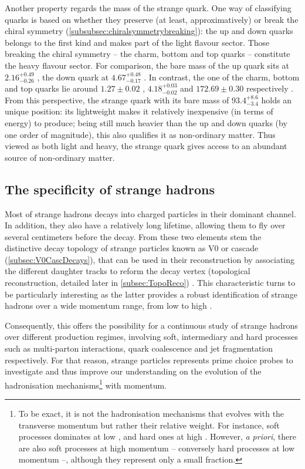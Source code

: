 Another property regards the mass of the strange quark. One way of classifying quarks is based on whether they preserve (at least, approximatively) or break the chiral symmetry (\Sec\ref{subsubsec:chiralsymmetrybreaking}): the up and down quarks belongs to the first kind and makes part of the light flavour sector. Those breaking the chiral symmetry -- the charm, bottom and top quarks -- constitute the heavy flavour sector. For comparison, the bare mass of the up quark sits at $2.16_{-0.26}^{+0.49}$ \mmass, the down quark at $4.67_{-0.17}^{+0.48}$ \mmass. In contrast, the one of the charm, bottom and top quarks lie around $1.27 \pm 0.02$ \gmass, $4.18_{-0.02}^{+0.03}$ \gmass and $172.69 \pm 0.30$ \gmass respectively \cite{particledatagroupReviewParticlePhysics2022}. From this perspective, the strange quark with its bare mass of $93.4_{-3.4}^{+8.6}$ \mev holds an unique position: its lightweight makes it relatively inexpensive (in terms of energy) to produce; being still much heavier than the up and down quarks (by one order of magnitude), this also qualifies it as non-ordinary matter. Thus viewed as both light and heavy, the strange quark gives access to an abundant source of non-ordinary matter.


\subsection{The specificity of strange hadrons}
\label{subsec:SpecStrangeHadrons}

Most of strange hadrons decays into charged particles in their dominant channel. In addition, they also have a relatively long lifetime, allowing them to fly over several centimeters before the decay. From these two elements stem the distinctive decay topology of strange particles known as V0 or cascade (\Sec\ref{subsec:V0CascDecays}), that can be used in their reconstruction by associating the different daughter tracks to reform the decay vertex (topological reconstruction, detailed later in \Sec\ref{subsec:TopoReco}) \cite{speltzCaracterisationEtatDense2006}. This characteristic turns to be particularly interesting as the latter provides a robust identification of strange hadrons over a wide momentum range, from low to high \pT.

Consequently, this offers the possibility for a continuous study of strange hadrons over different production regimes, involving soft, intermediary and hard processes such as multi-parton interactions, quark coalescence and jet fragmentation respectively. For that reason, strange particles represents prime choice probes to investigate and thus improve our understanding on the evolution of the hadronisation mechanisms\footnote{To be exact, it is not the hadronisation mechanisms that evolves with the transverse momentum but rather their relative weight. For instance, soft processes dominates at low \pT, and hard ones at high \pT. However, \textit{a priori}, there are also soft processes at high momentum -- conversely hard processes at low momentum --, although they represent only a small fraction.} with momentum.

